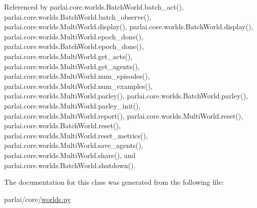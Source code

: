 Referenced by parlai.\+core.\+worlds.\+Batch\+World.\+batch\+\_\+act(), parlai.\+core.\+worlds.\+Batch\+World.\+batch\+\_\+observe(), parlai.\+core.\+worlds.\+Multi\+World.\+display(), parlai.\+core.\+worlds.\+Batch\+World.\+display(), parlai.\+core.\+worlds.\+Multi\+World.\+epoch\+\_\+done(), parlai.\+core.\+worlds.\+Batch\+World.\+epoch\+\_\+done(), parlai.\+core.\+worlds.\+Multi\+World.\+get\+\_\+acts(), parlai.\+core.\+worlds.\+Multi\+World.\+get\+\_\+agents(), parlai.\+core.\+worlds.\+Multi\+World.\+num\+\_\+episodes(), parlai.\+core.\+worlds.\+Multi\+World.\+num\+\_\+examples(), parlai.\+core.\+worlds.\+Multi\+World.\+parley(), parlai.\+core.\+worlds.\+Batch\+World.\+parley(), parlai.\+core.\+worlds.\+Multi\+World.\+parley\+\_\+init(), parlai.\+core.\+worlds.\+Multi\+World.\+report(), parlai.\+core.\+worlds.\+Multi\+World.\+reset(), parlai.\+core.\+worlds.\+Batch\+World.\+reset(), parlai.\+core.\+worlds.\+Multi\+World.\+reset\+\_\+metrics(), parlai.\+core.\+worlds.\+Multi\+World.\+save\+\_\+agents(), parlai.\+core.\+worlds.\+Multi\+World.\+share(), and parlai.\+core.\+worlds.\+Batch\+World.\+shutdown().



The documentation for this class was generated from the following file\+:\begin{DoxyCompactItemize}
\item 
parlai/core/\hyperlink{parlai_2core_2worlds_8py}{worlds.\+py}\end{DoxyCompactItemize}
